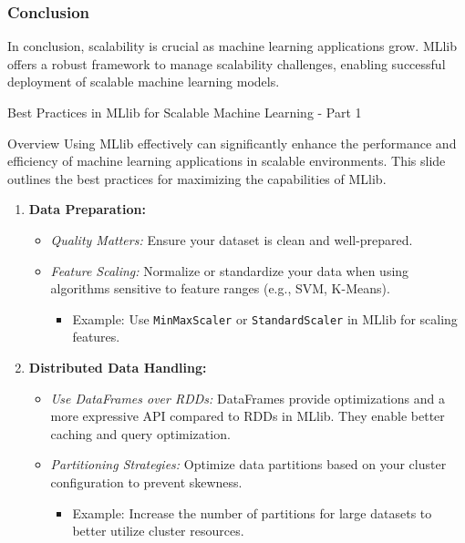 \documentclass[aspectratio=169]{beamer}
\begin{document}
\begin{frame}[fragile]
    \frametitle{Conclusion}
    In conclusion, scalability is crucial as machine learning applications grow. MLlib offers a robust framework to manage scalability challenges, enabling successful deployment of scalable machine learning models.
\end{frame}

\begin{frame}[fragile]{Best Practices in MLlib for Scalable Machine Learning - Part 1}
    \begin{block}{Overview}
        Using MLlib effectively can significantly enhance the performance and efficiency of machine learning applications in scalable environments. This slide outlines the best practices for maximizing the capabilities of MLlib.
    \end{block}
    
    \begin{enumerate}
        \item \textbf{Data Preparation:}
            \begin{itemize}
                \item \textit{Quality Matters:} Ensure your dataset is clean and well-prepared.
                \item \textit{Feature Scaling:} Normalize or standardize your data when using algorithms sensitive to feature ranges (e.g., SVM, K-Means).
                    \begin{itemize}
                        \item Example: Use \texttt{MinMaxScaler} or \texttt{StandardScaler} in MLlib for scaling features.
                    \end{itemize}
            \end{itemize}
        
        \item \textbf{Distributed Data Handling:}
            \begin{itemize}
                \item \textit{Use DataFrames over RDDs:} DataFrames provide optimizations and a more expressive API compared to RDDs in MLlib. They enable better caching and query optimization.
                \item \textit{Partitioning Strategies:} Optimize data partitions based on your cluster configuration to prevent skewness.
                    \begin{itemize}
                        \item Example: Increase the number of partitions for large datasets to better utilize cluster resources.
                    \end{itemize}
            \end{itemize}
    \end{enumerate}
\end{frame}
\end{document}
